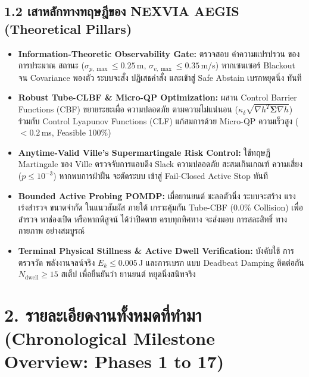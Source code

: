 \documentclass[10pt,a4paper]{article}
\begin{document}
\subsection*{\normalsize 1.2 เสาหลักทางทฤษฎีของ NEXVIA AEGIS (Theoretical Pillars)}
\vspace{-3pt}
\begin{itemize}[leftmargin=14pt, itemsep=1pt, topsep=1pt, parsep=0pt]
  \item \textbf{Information-Theoretic Observability Gate:} ตรวจสอบ ค่าความแปรปรวน ของการประมาณ สถานะ ($\sigma_{p,\max} \le 0.25\,$m, $\sigma_{v,\max} \le 0.35\,$m/s) หากเซนเซอร์ Blackout จน Covariance พองตัว ระบบจะสั่ง ปฏิเสธคำสั่ง และเข้าสู่ Safe Abstain เบรกหยุดนิ่ง ทันที
  \item \textbf{Robust Tube-CLBF \& Micro-QP Optimization:} ผสาน Control Barrier Functions (CBF) ขยายระยะเผื่อ ความปลอดภัย ตามความไม่แน่นอน ($\kappa_\delta \sqrt{\nabla h^T \boldsymbol{\Sigma} \nabla h}$) ร่วมกับ Control Lyapunov Functions (CLF) แก้สมการด้วย Micro-QP ความเร็วสูง ($<0.2\,$ms, Feasible 100\%)
  \item \textbf{Anytime-Valid Ville's Supermartingale Risk Control:} ใช้ทฤษฎี Martingale ของ Ville ตรวจจับการแอบดึง Slack ความปลอดภัย สะสมเกินเกณฑ์ ความเสี่ยง ($p \le 10^{-3}$) หากพบการฝ่าฝืน จะตัดระบบ เข้าสู่ Fail-Closed Active Stop ทันที
  \item \textbf{Bounded Active Probing POMDP:} เมื่อยานยนต์ ชะลอตัวนิ่ง ระบบจะสร้าง แรงเร่งสำรวจ ขนาดจำกัด ในแนวสัมผัส ภายใต้ เกราะคุ้มกัน Tube-CBF (0.0\% Collision) เพื่อสำรวจ หาช่องเปิด หรือหากพิสูจน์ ได้ว่าปิดตาย ครบทุกทิศทาง จะส่งมอบ การสละสิทธิ์ ทางกายภาพ อย่างสมบูรณ์
  \item \textbf{Terminal Physical Stillness \& Active Dwell Verification:} บังคับใช้ การตรวจวัด พลังงานจลน์จริง $E_k \le 0.005\,$J และการเบรก แบบ Deadbeat Damping ติดต่อกัน $N_{\text{dwell}} \ge 15$ สเต็ป เพื่อยืนยันว่า ยานยนต์ หยุดนิ่งสนิทจริง
\end{itemize}

\newpage

\section*{\textcolor{secondary}{\large 2. รายละเอียดงานทั้งหมดที่ทำมา (Chronological Milestone Overview: Phases 1 to 17)}}
\vspace{-4pt}
\end{document}
